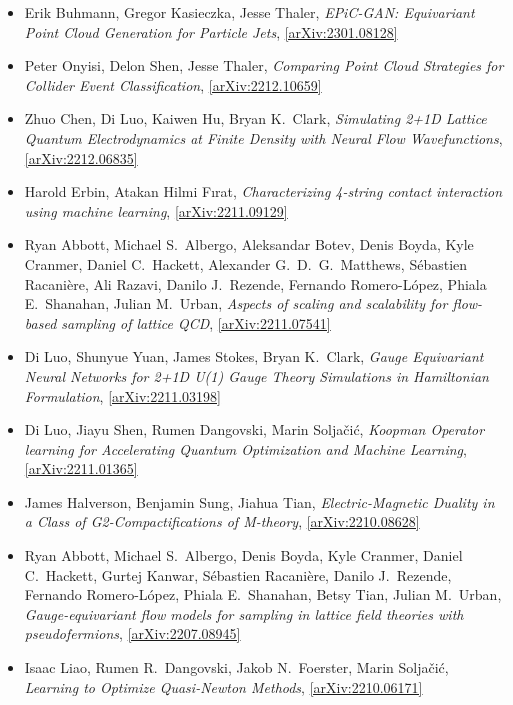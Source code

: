 \begin{itemize}
\item Erik Buhmann, Gregor Kasieczka, Jesse Thaler, \textit{EPiC-GAN: Equivariant Point Cloud Generation for Particle Jets}, \href{https://arxiv.org/abs/2301.08128}{[arXiv:2301.08128]} 
\item Peter Onyisi, Delon Shen, Jesse Thaler, \textit{Comparing Point Cloud Strategies for Collider Event Classification}, \href{https://arxiv.org/abs/2212.10659}{[arXiv:2212.10659]} 
\item Zhuo Chen, Di Luo, Kaiwen Hu, Bryan K.\  Clark, \textit{Simulating 2+1D Lattice Quantum Electrodynamics at Finite Density with Neural Flow Wavefunctions}, \href{https://arxiv.org/abs/2212.06835}{[arXiv:2212.06835]} 
\item Harold Erbin, Atakan Hilmi Fırat, \textit{Characterizing 4-string contact interaction using machine learning}, \href{https://arxiv.org/abs/2211.09129}{[arXiv:2211.09129]} 
\item Ryan Abbott, Michael S.\  Albergo, Aleksandar Botev, Denis Boyda, Kyle Cranmer, Daniel C.\  Hackett, Alexander G.\  D.\  G.\  Matthews, Sébastien Racanière, Ali Razavi, Danilo J.\  Rezende, Fernando Romero-López, Phiala E.\  Shanahan, Julian M.\  Urban, \textit{Aspects of scaling and scalability for flow-based sampling of lattice QCD}, \href{https://arxiv.org/abs/2211.07541}{[arXiv:2211.07541]} 
\item Di Luo, Shunyue Yuan, James Stokes, Bryan K.\  Clark, \textit{Gauge Equivariant Neural Networks for 2+1D U(1) Gauge Theory Simulations in Hamiltonian Formulation}, \href{https://arxiv.org/abs/2211.03198}{[arXiv:2211.03198]} 
\item Di Luo, Jiayu Shen, Rumen Dangovski, Marin Soljačić, \textit{Koopman Operator learning for Accelerating Quantum Optimization and Machine Learning}, \href{https://arxiv.org/abs/2211.01365}{[arXiv:2211.01365]} 
\item James Halverson, Benjamin Sung, Jiahua Tian, \textit{Electric-Magnetic Duality in a Class of G2-Compactifications of M-theory}, \href{https://arxiv.org/abs/2210.08628}{[arXiv:2210.08628]} 
\item Ryan Abbott, Michael S.\  Albergo, Denis Boyda, Kyle Cranmer, Daniel C.\  Hackett, Gurtej Kanwar, Sébastien Racanière, Danilo J.\  Rezende, Fernando Romero-López, Phiala E.\  Shanahan, Betsy Tian, Julian M.\  Urban, \textit{Gauge-equivariant flow models for sampling in lattice field theories with pseudofermions}, \href{https://arxiv.org/abs/2207.08945}{[arXiv:2207.08945]} 
\item Isaac Liao, Rumen R.\  Dangovski, Jakob N.\  Foerster, Marin Soljačić, \textit{Learning to Optimize Quasi-Newton Methods}, \href{https://arxiv.org/abs/2210.06171}{[arXiv:2210.06171]} 

\end{itemize}
